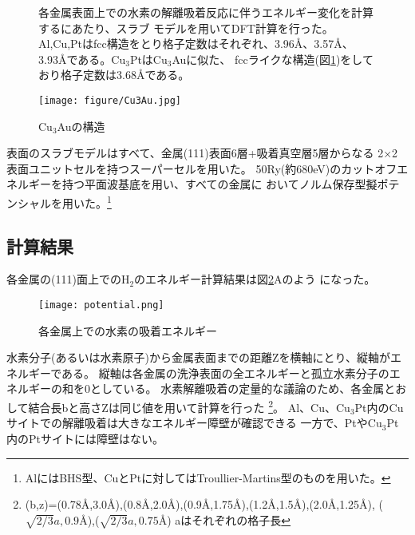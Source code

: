 \documentclass[12pt]{ltjsarticle}
\begin{document}
\begin{figure}[hbtp]
\begin{minipage}{.5\textwidth}
    各金属表面上での水素の解離吸着反応に伴うエネルギー変化を計算するにあたり、スラブ
    モデルを用いてDFT計算を行った。
    Al,Cu,Ptはfcc構造をとり格子定数はそれぞれ、3.96$\mbox{\AA}$、3.57$\mbox{\AA}$、
    3.93$\mbox{\AA}$である。$\text{Cu}_\text{3}$Ptは$\text{Cu}_\text{3}$Auに似た、
    fccライクな構造(図\ref{fig:Cu3Au})をしており格子定数は3.68$\mbox{\AA}$である。
\end{minipage}
\hfill
\begin{minipage}{.45\textwidth}
    \begin{center}
     \texttt{[image: figure/Cu3Au.jpg]}
    \end{center}
    \caption{Cu$_\text{3}$Auの構造}
    \label{fig:Cu3Au}
\end{minipage}
\end{figure}
表面のスラブモデルはすべて、金属(111)表面6層+吸着真空層5層からなる
2×2表面ユニットセルを持つスーパーセルを用いた。
50Ry(約680eV)のカットオフエネルギーを持つ平面波基底を用い、すべての金属に
おいてノルム保存型擬ポテンシャルを用いた。\footnote{AlにはBHS型、CuとPtに対してはTroullier-Martins型のものを用いた。}

\subsection{計算結果}
各金属の(111)面上での$\text{H}_\text{2}$のエネルギー計算結果は図\ref{fig:potential}Aのよう
になった。\\

\begin{figure}[hbtp]
    \begin{center}
     \texttt{[image: potential.png]}
    \end{center}
    \caption{各金属上での水素の吸着エネルギー}
    \label{fig:potential}
\end{figure}
水素分子(あるいは水素原子)から金属表面までの距離Zを横軸にとり、縦軸がエネルギーである。
縦軸は各金属の洗浄表面の全エネルギーと孤立水素分子のエネルギーの和を0としている。
水素解離吸着の定量的な議論のため、各金属とおして結合長bと高さZは同じ値を用いて計算を行った
\footnote{(b,z)=(0.78$\mbox{\AA}$,3.0$\mbox{\AA}$),(0.8$\mbox{\AA}$,2.0$\mbox{\AA}$),(0.9$\mbox{\AA}$,1.75$\mbox{\AA}$),(1.2$\mbox{\AA}$,1.5$\mbox{\AA}$),(2.0$\mbox{\AA}$,1.25$\mbox{\AA}$),
($\sqrt{2/3}a,0.9\mbox{\AA}$),($\sqrt{2/3}a,0.75\mbox{\AA}$) aはそれぞれの格子長}。
Al、Cu、$\text{Cu}_\text{3}$Pt内のCuサイトでの解離吸着は大きなエネルギー障壁が確認できる
一方で、Ptや$\text{Cu}_\text{3}$Pt内のPtサイトには障壁はない。
\end{document}
